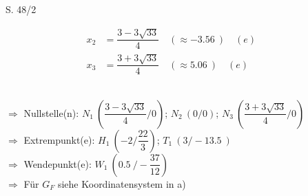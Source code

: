 \begin{Exercise}{S. 48/2}{}
\begin{enumerate}[leftmargin=*]
{\begin{enumerate}[label=\alph*),leftmargin=*]
{\begin{minipage}[t]{0.65\linewidth}
\begin{align*}
                        x_{2} &= \dfrac{3-3\sqrt{33}}{4} \quad (\approx \SI{-3.56}{}) \quad (\textit{e}) && \\[1.5ex]
                        x_{3} &= \dfrac{3+3\sqrt{33}}{4} \quad (\approx \SI{5.06}{}) \quad (\textit{e}) &&
                    \end{align*}
                \end{minipage}\\[1.5ex]
                $\Rightarrow$ Nullstelle(n): \quad $N_{1} \ \left(\dfrac{3-3\sqrt{33}}{4} / 0\right)$; \quad $N_{2} \ (0 / 0)$; \quad $N_{3} \ \left(\dfrac{3+3\sqrt{33}}{4} / 0\right)$\\[1.5ex]
                $\Rightarrow$ Extrempunkt(e): \quad $H_{1} \ \left(-2 / \dfrac{22}{3}\right)$; \quad $T_{1} \ \left(3 / -\SI{13.5}{}\right)$\\[1.5ex]
                $\Rightarrow$ Wendepunkt(e): \quad $W_{1} \ \left(\SI{0.5}{} / -\dfrac{37}{12}\right)$\\[1.5ex]
                $\Rightarrow$ Für $G_{F}$ siehe Koordinatensystem in a)
                }
        \end{enumerate}
        }
\end{enumerate}
\end{Exercise}
